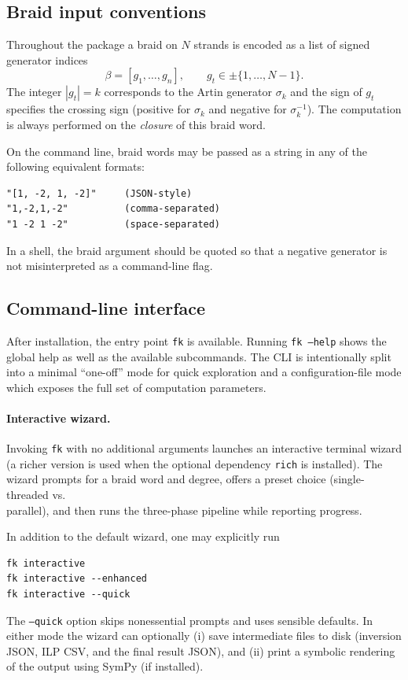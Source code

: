 \documentclass[twocolumn]{article}
\begin{document}
\subsection{Braid input conventions}

Throughout the package a braid on $N$ strands is encoded as a list of signed
generator indices
\[
  \beta=[g_1,\dots,g_n],\qquad g_t\in \pm\{1,\dots,N-1\}.
\]
The integer $|g_t|=k$ corresponds to the Artin generator $\sigma_k$ and the sign
of $g_t$ specifies the crossing sign (positive for $\sigma_k$ and negative for
$\sigma_k^{-1}$).  The computation is always performed on the \emph{closure} of
this braid word.

On the command line, braid words may be passed as a string in any of the
following equivalent formats:
\begin{verbatim}
"[1, -2, 1, -2]"     (JSON-style)
"1,-2,1,-2"          (comma-separated)
"1 -2 1 -2"          (space-separated)
\end{verbatim}
In a shell, the braid argument should be quoted so that a negative generator
is not misinterpreted as a command-line flag.

\subsection{Command-line interface}

After installation, the entry point \texttt{fk} is available.
Running \texttt{fk --help} shows the global help as well as the available
subcommands.  The CLI is intentionally split into a minimal ``one-off'' mode
for quick exploration and a configuration-file mode which exposes the full set
of computation parameters.

\paragraph{Interactive wizard.}
Invoking \texttt{fk} with no additional arguments launches an interactive
terminal wizard (a richer version is used when the optional dependency
\texttt{rich} is installed).  The wizard prompts for a braid word and degree,
offers a preset choice (single-threaded vs.\\ parallel), and then runs the
three-phase pipeline while reporting progress.

In addition to the default wizard, one may explicitly run
\begin{verbatim}
fk interactive
fk interactive --enhanced
fk interactive --quick
\end{verbatim}
The \texttt{--quick} option skips nonessential prompts and uses sensible
defaults.  In either mode the wizard can optionally (i) save intermediate files
to disk (inversion JSON, ILP CSV, and the final result JSON), and (ii) print a
symbolic rendering of the output using SymPy (if installed).
\end{document}

